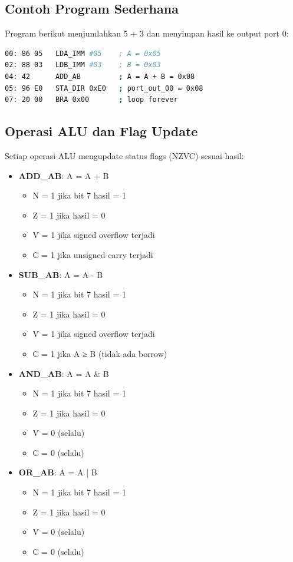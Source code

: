 \documentclass[12pt,a4paper]{report}
\begin{document}
\subsection{Contoh Program Sederhana}

Program berikut menjumlahkan 5 + 3 dan menyimpan hasil ke output port 0:

\begin{lstlisting}[language=bash]
00: 86 05   LDA_IMM #05    ; A = 0x05
02: 88 03   LDB_IMM #03    ; B = 0x03
04: 42      ADD_AB         ; A = A + B = 0x08
05: 96 E0   STA_DIR 0xE0   ; port_out_00 = 0x08
07: 20 00   BRA 0x00       ; loop forever
\end{lstlisting}

\subsection{Operasi ALU dan Flag Update}

Setiap operasi ALU mengupdate status flags (NZVC) sesuai hasil:

\begin{itemize}
  \item \textbf{ADD\_AB}: A = A + B
    \begin{itemize}
      \item N = 1 jika bit 7 hasil = 1
      \item Z = 1 jika hasil = 0
      \item V = 1 jika signed overflow terjadi
      \item C = 1 jika unsigned carry terjadi
    \end{itemize}
  \item \textbf{SUB\_AB}: A = A - B
    \begin{itemize}
      \item N = 1 jika bit 7 hasil = 1
      \item Z = 1 jika hasil = 0
      \item V = 1 jika signed overflow terjadi
      \item C = 1 jika A ≥ B (tidak ada borrow)
    \end{itemize}
  \item \textbf{AND\_AB}: A = A \& B
    \begin{itemize}
      \item N = 1 jika bit 7 hasil = 1
      \item Z = 1 jika hasil = 0
      \item V = 0 (selalu)
      \item C = 0 (selalu)
    \end{itemize}
  \item \textbf{OR\_AB}: A = A | B
    \begin{itemize}
      \item N = 1 jika bit 7 hasil = 1
      \item Z = 1 jika hasil = 0
      \item V = 0 (selalu)
      \item C = 0 (selalu)
    \end{itemize}
\end{itemize}
\end{document}
